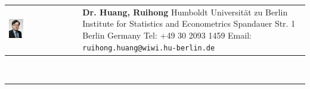 \documentclass[a4paper,10pt]{article}
\begin{document}
\fancyhf{}
\renewcommand{\headrulewidth}{0pt}
\renewcommand{\footrulewidth}{1pt}
\renewcommand\footrule{\begin{minipage}{1\textwidth}
\hrule width \hsize height 2pt \kern 1mm \hrule width \hsize   
\end{minipage}\par}
\pagestyle{fancy}
\begin{tabular}[h]{p{}p{}}
  \vfill\hspace{-10pt}\includegraphics[width=0.22\textwidth]{bew/ruihong_2013.jpg} &\vspace{1pt}\large{\textbf{Dr. Huang, Ruihong}\newline
  \vspace{-8pt} \newline
Humboldt Universit\"at zu Berlin \newline 
Institute for Statistics and Econometrics  ­\newline
Spandauer Str. 1  \newline
10178 Berlin\newline
Germany \newline
Tel: +49 30 2093 1459 \newline
Email: \verb|ruihong.huang@wiwi.hu-berlin.de| } \\
\end{tabular}\\
\rule[5pt]{1\textwidth}{1pt}\par
\setlength{\tabcolsep}{10pt}
\setlength{\extrarowheight}{6pt}
\end{document}
